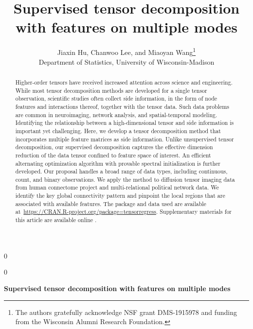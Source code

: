 \documentclass[12pt]{article}
\newcommand{\blind}{0}
\theoremstyle{definition}
\theoremstyle{definition}
\begin{document}
%

\def\spacingset#1{\renewcommand{\baselinestretch}%
{#1}\small\normalsize} \spacingset{1}




\blind
{
  \title{\bf Supervised tensor decomposition with features on multiple modes}
  \author{Jiaxin Hu, Chanwoo Lee, and Miaoyan Wang\thanks{The authors gratefully acknowledge NSF grant DMS-1915978 and funding from the Wisconsin Alumni Research Foundation. }\hspace{.2cm}\\
    Department of Statistics, University of Wisconsin-Madison}
  \maketitle
  
  
  
} \fi

\blind
{
  \bigskip
  \bigskip
  \bigskip
  \begin{center}
    {\LARGE\bf Supervised tensor decomposition with features on multiple modes}
\end{center}
  \medskip
} \fi


\bigskip
\begin{abstract}
Higher-order tensors have received increased attention across science and engineering. While most tensor decomposition methods are developed for a single tensor observation, scientific studies often collect side information, in the form of node features and interactions thereof, together with the tensor data. Such data problems are common in neuroimaging, network analysis, and spatial-temporal modeling. Identifying the relationship between a high-dimensional tensor and side information is important yet challenging. Here, we develop a tensor decomposition method that incorporates multiple feature matrices as side information. Unlike unsupervised tensor decomposition, our supervised decomposition captures the effective dimension reduction of the data tensor confined to feature space of interest. An efficient alternating optimization algorithm with provable spectral initialization is further developed. Our proposal handles a broad range of data types, including continuous, count, and binary observations. We apply the method to diffusion tensor imaging data from human connectome project and multi-relational political network data. We identify the key global connectivity pattern and pinpoint the local regions that are associated with available features. The package and data used are available at~\url{https://CRAN.R-project.org/package=tensorregress}. Supplementary materials for this article are available online .

\end{abstract}
\end{document}
